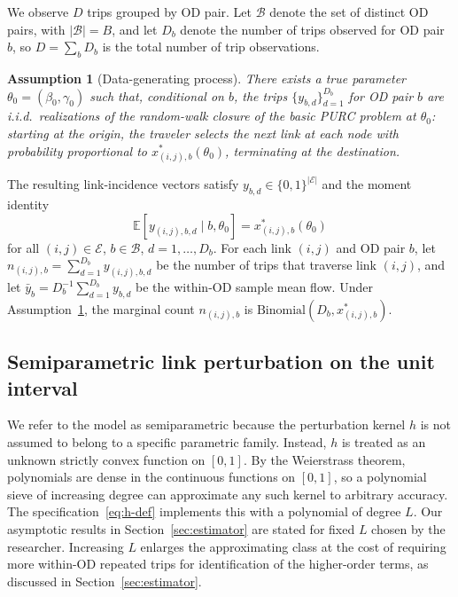 \documentclass[12pt]{article}
\newcommand{\cE}{\mathcal{E}}
\newcommand{\cB}{\mathcal{B}}
\newtheorem{assumption}{Assumption}
\begin{document}
We observe $D$ trips grouped by OD pair. Let $\cB$ denote the set of distinct OD pairs, with $|\cB| = B$, and let $D_b$ denote the number of trips observed for OD pair $b$, so $D = \sum_b D_b$ is the total number of trip observations.

\begin{assumption}[Data-generating process]\label{as:dgp}
There exists a true parameter $\theta_0 = (\beta_0, \gamma_0)$ such that, conditional on $b$, the trips $\{y_{b,d}\}_{d=1}^{D_b}$ for OD pair $b$ are i.i.d.\ realizations of the random-walk closure of the basic PURC problem at $\theta_0$: starting at the origin, the traveler selects the next link at each node with probability proportional to $x^*_{(i,j),b}(\theta_0)$, terminating at the destination.
\end{assumption}

The resulting link-incidence vectors satisfy $y_{b,d} \in \{0, 1\}^{|\cE|}$ and the moment identity
\begin{equation}\label{eq:moment-identity}
    \mathbb{E}[y_{(i,j),b,d} \mid b, \theta_0] = x^*_{(i,j),b}(\theta_0)
\end{equation}
for all $(i,j) \in \cE$, $b \in \cB$, $d = 1, \ldots, D_b$. For each link $(i,j)$ and OD pair $b$, let $n_{(i,j),b} = \sum_{d=1}^{D_b} y_{(i,j),b,d}$ be the number of trips that traverse link $(i,j)$, and let $\bar{y}_b = D_b^{-1} \sum_{d=1}^{D_b} y_{b,d}$ be the within-OD sample mean flow. Under Assumption~\ref{as:dgp}, the marginal count $n_{(i,j),b}$ is $\text{Binomial}(D_b, x^*_{(i,j),b})$.

\subsection{Semiparametric link perturbation on the unit interval}\label{sec:perturbation}

We refer to the model as semiparametric because the perturbation kernel $h$ is not assumed to belong to a specific parametric family. Instead, $h$ is treated as an unknown strictly convex function on $[0,1]$. By the Weierstrass theorem, polynomials are dense in the continuous functions on $[0,1]$, so a polynomial sieve of increasing degree can approximate any such kernel to arbitrary accuracy. The specification~\eqref{eq:h-def} implements this with a polynomial of degree $L$. Our asymptotic results in Section~\ref{sec:estimator} are stated for fixed $L$ chosen by the researcher. Increasing $L$ enlarges the approximating class at the cost of requiring more within-OD repeated trips for identification of the higher-order terms, as discussed in Section~\ref{sec:estimator}.
\end{document}

